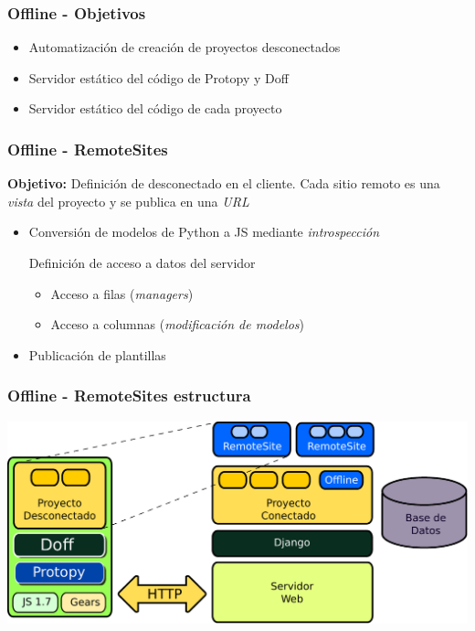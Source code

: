 \documentclass{beamer}
\begin{document}
\begin{farme}
    \frametitle{Offline - Objetivos}
    \begin{itemize}
        \item{Automatización de creación de proyectos desconectados}
        \item{Servidor estático del código de Protopy y Doff}
        \item{Servidor estático del código de cada proyecto}
    \end{itemize}
\end{farme}

\begin{frame}

    \frametitle{Offline - RemoteSites}
    \par{
        \par{\bf Objetivo:}
        Definición de desconectado en el cliente. Cada sitio remoto es una {\it vista}
        del proyecto y se publica en una {\it URL}

    }
    \begin{itemize}
      \item{Conversión de modelos de Python a JS mediante {\it introspección}}
      \begin{item}Definición de acceso a datos del servidor
        \begin{itemize}
          \item {Acceso a filas ({\it managers})}
          \item {Acceso a columnas ({\it modificación de modelos})}
        \end{itemize}
      \end{item}
      \item{Publicación de plantillas}
    \end{itemize}

\end{frame}

\begin{frame}

    \frametitle{Offline - RemoteSites estructura}
    \includegraphics[scale=0.5]{remote_sites.pdf}
    
\end{frame}
\end{document}
